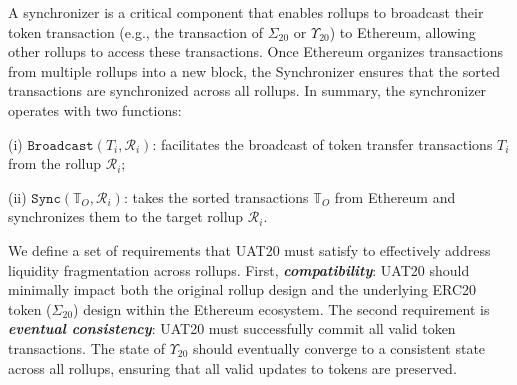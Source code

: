 

















 A synchronizer is a critical component that enables rollups to broadcast their token transaction (e.g., the transaction of $\Sigma_{20}$ or $\Upsilon_{20}$) to Ethereum, allowing other rollups to access these transactions. Once Ethereum organizes transactions from multiple rollups into a new block, the Synchronizer ensures that the sorted 
transactions are synchronized across all rollups. In summary, the synchronizer operates with two functions:

\noindent (i) $\mathtt{Broadcast}(T_i, \mathcal{R}_i)$: facilitates the broadcast of token transfer transactions $T_i$ from the rollup $\mathcal{R}_i$;

\noindent (ii) $\mathtt{Sync}(\mathbb{T}_{O}, \mathcal{R}_i)$: takes the sorted transactions $\mathbb{T}_{O}$ from Ethereum and synchronizes them to the target rollup $\mathcal{R}_i$.








 We define a set of requirements that UAT20 must satisfy to effectively address liquidity fragmentation across rollups. First, \emph{\textbf{compatibility}}: UAT20 should minimally impact both the original rollup design and the underlying ERC20 token ($\Sigma_{20}$) design within the Ethereum ecosystem. The second requirement is \emph{\textbf{eventual consistency}}: UAT20 must successfully commit all valid token transactions. The state of $\Upsilon_{20}$ should eventually converge to a consistent state across all rollups, ensuring that all valid updates to tokens are preserved.



